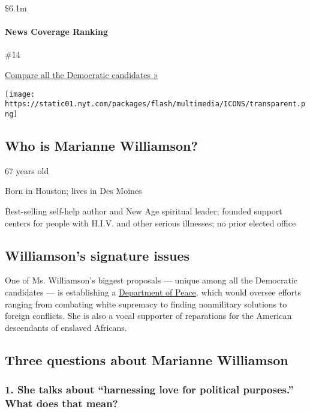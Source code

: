 \$6.1m

\hypertarget{news-coverage-ranking}{%
\paragraph{News Coverage Ranking}\label{news-coverage-ranking}}

\#14

\href{https://www.nytimes.com/interactive/2020/us/elections/democratic-polls.html}{Compare
all the Democratic candidates »}

\texttt{[image: https://static01.nyt.com/packages/flash/multimedia/ICONS/transparent.png]}

\hypertarget{who-is-marianne-williamson}{%
\subsection{Who is Marianne
Williamson?}\label{who-is-marianne-williamson}}

67 years old

Born in Houston; lives in Des Moines

Best-selling self-help author and New Age spiritual leader; founded
support centers for people with H.I.V. and other serious illnesses; no
prior elected office

\hypertarget{williamsons-signature-issues}{%
\subsection{Williamson's signature
issues}\label{williamsons-signature-issues}}

One of Ms. Williamson's biggest proposals --- unique among all the
Democratic candidates --- is establishing a
\href{https://www.marianne2020.com/posts/join-us-to-build-a-u-s-department-of-peace}{Department
of Peace}, which would oversee efforts ranging from combating white
supremacy to finding nonmilitary solutions to foreign conflicts. She is
also a vocal supporter of reparations for the American descendants of
enslaved Africans.

\hypertarget{three-questions-about-marianne-williamson}{%
\subsection{Three questions about Marianne
Williamson}\label{three-questions-about-marianne-williamson}}

\hypertarget{1-she-talks-about-harnessing-love-for-political-purposes-what-does-that-mean}{%
\subsubsection{\texorpdfstring{\textbf{1. She talks about ``harnessing
love for political purposes.'' What does that
mean?}}{1. She talks about ``harnessing love for political purposes.'' What does that mean?}}\label{1-she-talks-about-harnessing-love-for-political-purposes-what-does-that-mean}}

